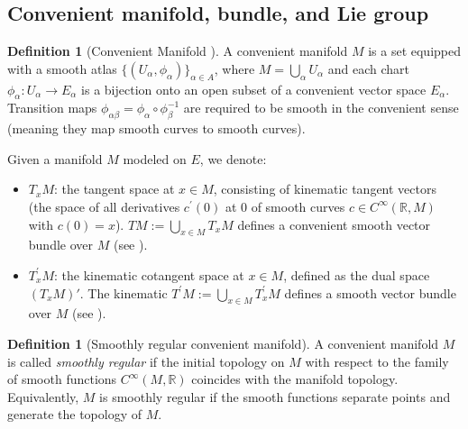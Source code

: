 \documentclass[11pt,reqno]{amsart}
\theoremstyle{definition}
\newtheorem{definition}[theorem]{Definition}
\numberwithin{equation}{section}
\begin{document}
\subsection{Convenient manifold, bundle, and Lie group}

\begin{definition}[Convenient Manifold {\cite[27.1]{20}}]
A convenient manifold $M$ is a set equipped with a smooth atlas $\{(U_{\alpha}, \phi_{\alpha})\}_{\alpha \in A}$, where $M = \bigcup_{\alpha} U_{\alpha}$ and each chart $\phi_{\alpha}: U_{\alpha} \rightarrow E_{\alpha}$ is a bijection onto an open subset of a convenient vector space $E_{\alpha}$. Transition maps $\phi_{\alpha\beta} = \phi_{\alpha} \circ \phi_{\beta}^{-1}$ are required to be smooth in the convenient sense (meaning they map smooth curves to smooth curves).
\end{definition}

Given a manifold $M$ modeled on $E$, we denote:
\begin{itemize}
    \item $T_{x}M$: the tangent space at $x \in M$, consisting of kinematic tangent vectors (the space of all derivatives $c^{\prime}(0)$ at 0 of smooth curves $c \in C^{\infty}(\mathbb{R}, M)$ with $c(0)=x$). $TM := \bigcup_{x \in M} T_{x}M$ defines a convenient smooth vector bundle over $M$ (see \cite[28.12]{20}).
    \item $T_{x}^{\prime}M$: the kinematic cotangent space at $x \in M$, defined as the dual space $(T_{x}M)'$. The kinematic $T^{\prime}M := \bigcup_{x \in M} T_{x}^{\prime}M$ defines a smooth vector bundle over $M$ (see \cite[33.1]{20}).
\end{itemize}

\begin{definition}[Smoothly regular convenient manifold]
A convenient manifold $M$ is called \textit{smoothly regular} if the initial topology on $M$ with respect to the family of smooth functions $C^{\infty}(M, \mathbb{R})$ coincides with the manifold topology. Equivalently, $M$ is smoothly regular if the smooth functions separate points and generate the topology of $M$.
\end{definition}
\end{document}
